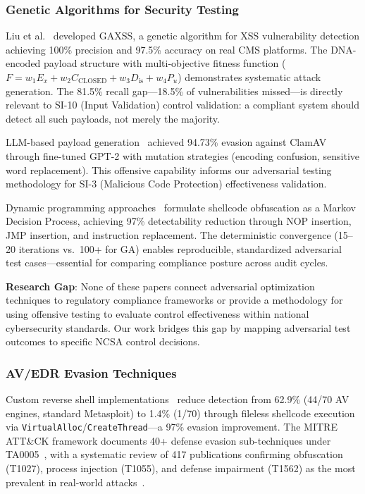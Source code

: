 \documentclass[futureinternet,article,submit,pdftex,moreauthors]{Definitions/mdpi}
\begin{document}
\subsubsection{Genetic Algorithms for Security Testing}

Liu et al.~\cite{ga_xss_paper} developed GAXSS, a genetic algorithm for XSS vulnerability
detection achieving 100\% precision and 97.5\% accuracy on real CMS platforms. The
DNA-encoded payload structure with multi-objective fitness function
($F = w_1 E_x + w_2 C_{\text{CLOSED}} + w_3 D_{\text{is}} + w_4 P_u$) demonstrates
systematic attack generation. The 81.5\% recall gap---18.5\% of vulnerabilities missed---is
directly relevant to SI-10 (Input Validation) control validation: a compliant system should
detect all such payloads, not merely the majority.

LLM-based payload generation~\cite{llm_payload_paper} achieved 94.73\% evasion against
ClamAV through fine-tuned GPT-2 with mutation strategies (encoding confusion, sensitive word
replacement). This offensive capability informs our adversarial testing methodology for SI-3
(Malicious Code Protection) effectiveness validation.

Dynamic programming approaches~\cite{dp_payload_paper} formulate shellcode obfuscation as a
Markov Decision Process, achieving 97\% detectability reduction through NOP insertion, JMP
insertion, and instruction replacement. The deterministic convergence (15--20 iterations
vs.\ 100+ for GA) enables reproducible, standardized adversarial test cases---essential for
comparing compliance posture across audit cycles.

\textbf{Research Gap}: None of these papers connect adversarial optimization techniques to
regulatory compliance frameworks or provide a methodology for using offensive testing to
evaluate control effectiveness within national cybersecurity standards. Our work bridges this
gap by mapping adversarial test outcomes to specific NCSA control decisions.

\subsubsection{AV/EDR Evasion Techniques}

Custom reverse shell implementations~\cite{reverse_shell_paper} reduce detection from 62.9\%
(44/70 AV engines, standard Metasploit) to 1.4\% (1/70) through fileless shellcode execution
via \texttt{VirtualAlloc}/\texttt{CreateThread}---a 97\% evasion improvement. The MITRE
ATT\&CK framework documents 40+ defense evasion sub-techniques under
TA0005~\cite{mitre_attack_sok}, with a systematic review of 417 publications confirming
obfuscation (T1027), process injection (T1055), and defense impairment (T1562) as the most
prevalent in real-world attacks~\cite{mitre_attack_applications}.
\end{document}
